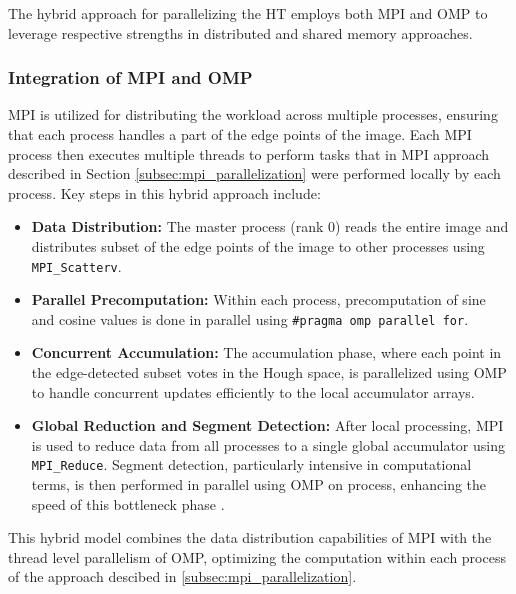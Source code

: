 \documentclass[conference]{IEEEtran}
\begin{document}
        The hybrid approach for parallelizing the HT employs both MPI and OMP to leverage respective strengths in distributed and shared memory approaches. 
    
        \subsubsection{Integration of MPI and OMP}
        \label{subsubsec:integration_mpi_openmp}
        
        MPI is utilized for distributing the workload across multiple processes, ensuring that each process handles a part of the edge points of the image. Each MPI process then executes multiple threads to perform tasks that in MPI approach described in Section \ref{subsec:mpi_parallelization} were performed locally by each process. Key steps in this hybrid approach include:
        
        \begin{itemize}
            \item \textbf{Data Distribution:} The master process (rank 0) reads the entire image and distributes subset of the edge points of the image to other processes using \texttt{MPI\_Scatterv}.
            
            \item \textbf{Parallel Precomputation:} Within each process, precomputation of sine and cosine values is done in parallel using \texttt{\#pragma omp parallel for}.
    
            \item \textbf{Concurrent Accumulation:} The accumulation phase, where each point in the edge-detected subset votes in the Hough space, is parallelized using OMP to handle concurrent updates efficiently to the local accumulator arrays.
    
            \item \textbf{Global Reduction and Segment Detection:} After local processing, MPI is used to reduce data from all processes to a single global accumulator using \texttt{MPI\_Reduce}. Segment detection, particularly intensive in computational terms, is then performed in parallel using OMP on process, enhancing the speed of this bottleneck phase
            .
    \end{itemize}
    
    This hybrid model combines the data distribution capabilities of MPI with the thread level parallelism of OMP, optimizing the computation within each process of the approach descibed in \ref{subsec:mpi_parallelization}.
    
\end{document}
